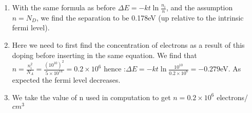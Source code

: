 \documentclass{article}
\begin{document}
\begin{prob}
\begin{enumerate}
	\item With the same formula as before $\Delta E=-kt\ln\frac{n_i}{n}$, and the assumption $n=N_D$, we find the separation to be 0.178eV (up relative to the intrinsic fermi level). 
	\item Here we need to first find the concentration of electrons as a result of this doping before inserting in the same equation. We find that $n=\frac{n_i^2}{N_A}=\frac{(10^{10})^2}{5\times10^{14}}=0.2\times10^6$ hence :$\Delta E=-kt\ln\frac{10^{10}}{0.2\times10^6}=-0.279$eV. As expected the fermi level decreases.
	\item We take the value of n used in computation to get $n=0.2\times10^6$ electrons/$cm^3$
\end{enumerate}
\end{prob}
\end{document}

